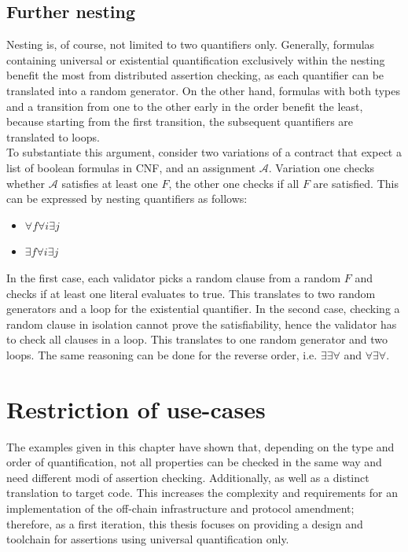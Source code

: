 \subsection{Further nesting}
Nesting is, of course, not limited to two quantifiers only. Generally, formulas containing universal or existential quantification exclusively within the nesting benefit the most from distributed assertion checking, as each quantifier can be translated into a random generator. On the other hand, formulas with both types and a transition from one to the other early in the order benefit the least, because starting from the first transition, the subsequent quantifiers are translated to loops.\\
To substantiate this argument, consider two variations of a contract that expect a list of boolean formulas in CNF, and an assignment $\mathcal{A}$. Variation one checks whether $\mathcal{A}$ satisfies at least one $F$, the other one checks if all $F$ are satisfied. This can be expressed by nesting quantifiers as follows: 
\begin{itemize}
\item $\forall f \forall i \exists j$
\item $\exists f \forall i \exists j$
\end{itemize}
In the first case, each validator picks a random clause from a random $F$ and checks if at least one literal evaluates to true. This translates to two random generators and a loop for the existential quantifier. In the second case, checking a random clause in isolation cannot prove the satisfiability, hence the validator has to check all clauses in a loop. This translates to one random generator and two loops. The same reasoning can be done for the reverse order, i.e. $\exists\exists\forall$ and $\forall\exists\forall$.

\section{Restriction of use-cases}\label{sec:restrict}
The examples given in this chapter have shown that, depending on the type and order of quantification, not all properties can be checked in the same way and need different modi of assertion checking. Additionally,  as well as a distinct translation to target code. This increases the complexity and requirements for an implementation of the off-chain infrastructure and protocol amendment; therefore, as a first iteration, this thesis focuses on providing a design and toolchain for assertions using universal quantification only.

